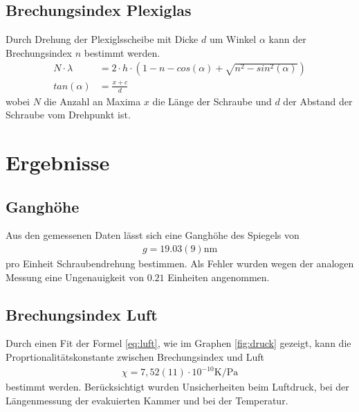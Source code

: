 \documentclass[11pt, a4paper]{article}
\begin{document}
    \subsection{Brechungsindex Plexiglas}
    Durch Drehung der Plexiglsscheibe mit Dicke $d$ um Winkel $\alpha$ kann der Brechungsindex $n$ bestimmt werden.
    \begin{align}
        N \cdot \lambda &= 2 \cdot h \cdot \left(1 - n - cos(\alpha) + \sqrt{n^2 - sin^2(\alpha)}\right)\label{fitplex} \\
        tan(\alpha) &= \frac{x + c}{d} \label{Winkelum}
    \end{align}
    wobei $N$ die Anzahl an Maxima $x$ die Länge der Schraube und $d$ der Abstand der Schraube vom Drehpunkt ist.

    \section{Ergebnisse}
    \subsection{Ganghöhe}

    Aus den gemessenen Daten lässt sich eine Ganghöhe des Spiegels von
    \begin{align}
        g = 19.03(9) \si{\nano\metre}
    \end{align}
    pro Einheit Schraubendrehung bestimmen. Als Fehler wurden wegen der analogen Messung eine Ungenauigkeit von $0.21$ Einheiten angenommen.  
    
   
    \subsection{Brechungsindex Luft}

    Durch einen Fit der Formel \ref{eq:luft}, wie im Graphen \ref{fig:druck} gezeigt, kann die Proprtionalitätskonstante zwischen Brechungsindex und Luft
    \begin{align}
        \chi = 7,52(11) \cdot 10^{-10} \si{\kelvin\per\pascal}
    \end{align}
    bestimmt werden. Berücksichtigt wurden Unsicherheiten beim Luftdruck, bei der Längenmessung der evakuierten Kammer und bei der Temperatur.
    
\end{document}
